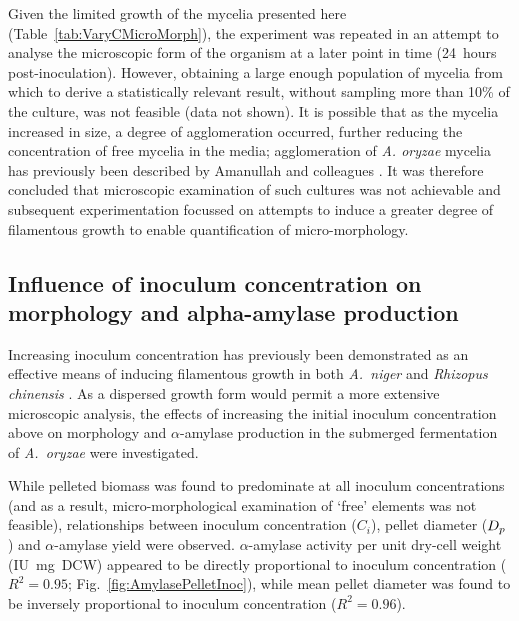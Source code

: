 Given the limited growth of the mycelia presented here (Table~\ref{tab:VaryCMicroMorph}), the experiment was repeated in an attempt to analyse the microscopic form of the organism at a later point in time (24~hours post-inoculation). However, obtaining a large enough population of mycelia from which to derive a statistically relevant result, without sampling more than 10\% of the culture, was not feasible (data not shown). It is possible that as the mycelia increased in size, a degree of agglomeration occurred, further reducing the concentration of free mycelia in the media; agglomeration of \emph{A. oryzae} mycelia has previously been described by Amanullah and colleagues \cite{amanullah2001}. It was therefore concluded that microscopic examination of such cultures was not achievable and subsequent experimentation focussed on attempts to induce a greater degree of filamentous growth to enable quantification of micro-morphology.

\subsection{Influence of inoculum concentration on morphology and alpha-amylase production}

Increasing inoculum concentration has previously been demonstrated as an effective means of inducing filamentous growth in both \emph{A.~niger} \cite{papagianni2006a} and \emph{Rhizopus chinensis} \cite{teng2009}. As a dispersed growth form would permit a more extensive microscopic analysis, the effects of increasing the initial inoculum concentration above  on morphology and $\alpha$-amylase production in the submerged fermentation of \emph{A.~oryzae} were investigated.

While pelleted biomass was found to predominate at all inoculum concentrations (and as a result, micro-morphological examination of \lq free' elements was not feasible), relationships between inoculum concentration ($C_i$), pellet diameter ($D_p$) and $\alpha$-amylase yield were observed. $\alpha$-amylase activity per unit dry-cell weight (IU~mg~DCW) appeared to be directly proportional to inoculum concentration ($R^2 = 0.95$; Fig.~\ref{fig:AmylasePelletInoc}), while mean pellet diameter was found to be inversely proportional to inoculum concentration ($R^2 = 0.96$).

